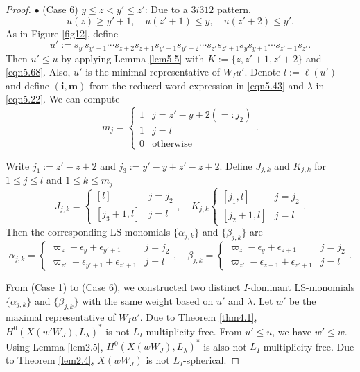 \documentclass[12pt]{amsart}
\theoremstyle{definition}
\theoremstyle{remark}
\begin{document}
\begin{proof}
$\bullet$ (Case 6) $y \leq z <  y' \leq z'$: Due to a $3i312$ pattern,
\begin{equation}\label{eqn5.68}
u(z) \geq y'+1, \quad u(z'+1) \leq y, \quad u(z'+2) \leq y'.
\end{equation}
As in Figure \ref{fig12}, define
\begin{equation}\label{eqn5.43}
u':=s_{y'} s_{y'-1} \cdots s_{z+2} s_{z+1} s_{y'+1} s_{y'+2} \cdots s_{z'} s_{z'+1} s_{y}s_{y+1} \cdots s_{z'-1} s_{z'}.
\end{equation}
Then $u' \leq u$ by applying Lemma \ref{lem5.5} with $K:=\{z , z'+1 , z'+2\}$ and \eqref{eqn5.68}. Also, $u'$ is the minimal representative of $W_Iu'$. Denote $l:= \ell (u')$ and define $(\mathbf{i}, \mathbf{m})$ from the reduced word expression in \eqref{eqn5.43} and $\lambda$ in \eqref{eqn5.22}. We can compute
\begin{equation}\label{eqn5.44}
m_j = 
\begin{cases}
1 & j = z'-y+2(=:j_2) \\
1 & j = l \\
0 & \text{otherwise}
\end{cases}
.
\end{equation}

Write $j_1:= z'-z+2$ and $j_3:= y'-y+z'-z+2$. Define $J_{j,k}$ and $K_{j,k}$ for $1\leq j \leq l$ and $1 \leq k \leq m_j$
\begin{equation}\label{eqn5.45}
J_{j,k} = 
\begin{cases}
[l] & j=j_2 \\
[j_3 +1 , l] & j = l
\end{cases}
, \quad K_{j,k}
\begin{cases}
[j_1,l]& j =j_2 \\
[j_2+1,l]& j =l
\end{cases}
.
\end{equation}
Then the corresponding LS-monomials $\{\alpha_{j,k}\}$ and $\{\beta_{j,k}\}$ are
\begin{equation}\label{eqn5.46}
\alpha_{j,k} = 
\begin{cases}
\varpi_{z}-\epsilon_y+\epsilon_{y'+1} & j = j_2 \\
\varpi_{z'}-\epsilon_{y'+1}+\epsilon_{z'+1} & j=l 
\end{cases}
, \quad \beta_{j,k}=
\begin{cases}
\varpi_{z}-\epsilon_{y} + \epsilon_{z+1} & j = j_2 \\
\varpi_{z'}-\epsilon_{z+1} + \epsilon_{z'+1} & j=l 
\end{cases}
.
\end{equation}

From (Case 1) to (Case 6), we constructed two distinct $I$-dominant LS-monomials $\{\alpha_{j,k}\}$ and $\{\beta_{j,k}\}$ with the same weight based on $u'$ and $\lambda$. Let $w'$ be the maximal representative of $W_I u'$. Due to Theorem \ref{thm4.1}, $H^0(X(w'W_J), L_\lambda)^*$ is not $L_I$-multiplicity-free. From $u'\leq u$, we have $w' \leq w$. Using Lemma \ref{lem2.5}, $H^0(X(wW_J), L_\lambda)^*$ is also not $L_I$-multiplicity-free. Due to Theorem \ref{lem2.4}, $X(wW_J)$ is not $L_I$-spherical.
\end{proof}
\end{document}

